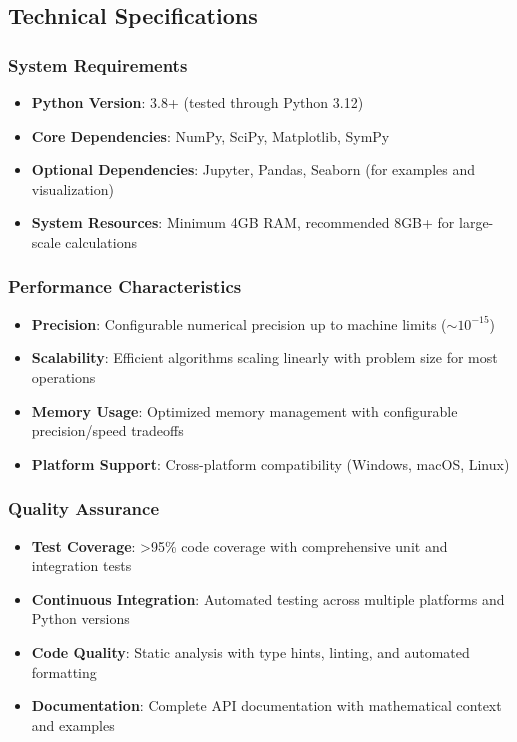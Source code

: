 \subsection{Technical Specifications}
\label{subsec:technical_specifications}

\subsubsection{System Requirements}

\begin{itemize}
\item \textbf{Python Version}: 3.8+ (tested through Python 3.12)
\item \textbf{Core Dependencies}: NumPy, SciPy, Matplotlib, SymPy
\item \textbf{Optional Dependencies}: Jupyter, Pandas, Seaborn (for examples and visualization)
\item \textbf{System Resources}: Minimum 4GB RAM, recommended 8GB+ for large-scale calculations
\end{itemize}

\subsubsection{Performance Characteristics}

\begin{itemize}
\item \textbf{Precision}: Configurable numerical precision up to machine limits ($\sim 10^{-15}$)
\item \textbf{Scalability}: Efficient algorithms scaling linearly with problem size for most operations
\item \textbf{Memory Usage}: Optimized memory management with configurable precision/speed tradeoffs
\item \textbf{Platform Support}: Cross-platform compatibility (Windows, macOS, Linux)
\end{itemize}

\subsubsection{Quality Assurance}

\begin{itemize}
\item \textbf{Test Coverage}: >95\% code coverage with comprehensive unit and integration tests
\item \textbf{Continuous Integration}: Automated testing across multiple platforms and Python versions
\item \textbf{Code Quality}: Static analysis with type hints, linting, and automated formatting
\item \textbf{Documentation}: Complete API documentation with mathematical context and examples
\end{itemize}

